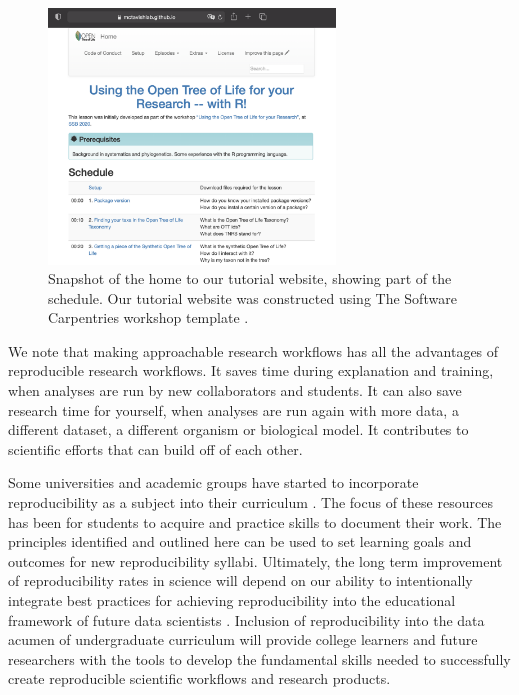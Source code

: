 \documentclass[12pt]{article}
\begin{document}
\begin{figure}
\begin{center}
\includegraphics[width=3in]{fig-schedule.png}
\end{center}
\caption{Snapshot of the home to our tutorial website, showing part of the schedule.
 Our tutorial website was constructed using The Software Carpentries workshop template \citep{swc-workshop-template}. \label{fig:schedule}}
\end{figure}

We note that making approachable research workflows has all the advantages of reproducible research workflows.
It saves time during explanation and training, when analyses are run by new collaborators and students.
It can also save research time for yourself, when analyses are run again with more data, a different dataset, a different organism or biological model.
It contributes to scientific efforts that can build off of each other.

Some universities and academic groups have started to incorporate reproducibility as a subject into their curriculum
\citep{uwlibraries2022, nigms2022, psyteachr2022}.
The focus of these resources has been for students to acquire and practice skills to document their work.
The principles identified and outlined here can be used to set learning goals and outcomes for new reproducibility syllabi.
Ultimately, the long term improvement of reproducibility rates in science will depend on our ability to intentionally integrate best practices for achieving reproducibility into the educational framework of future data scientists \citep{nasem2018data}.
Inclusion of reproducibility into the data acumen of undergraduate curriculum will provide college learners and future researchers with the tools to develop the fundamental skills needed to successfully create reproducible scientific workflows and research products.
\end{document}
